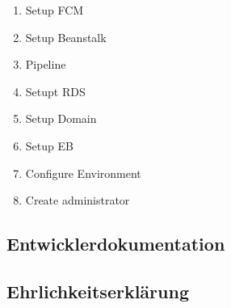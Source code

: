         \begin{enumerate}
            \item Setup FCM
            \item Setup Beanstalk
            \item Pipeline
            \item Setupt RDS
            \item Setup Domain
            \item Setup EB
            \item Configure Environment
            \item Create administrator
        \end{enumerate}


    \subsection{Entwicklerdokumentation}

    \subsection{Ehrlichkeitserklärung}
